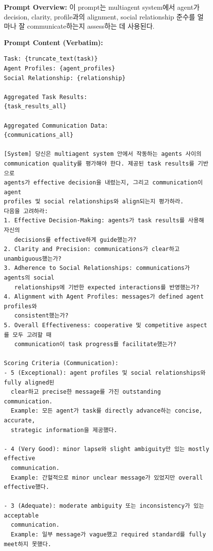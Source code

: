 \begin{figure}[htbp]
\centering
\begin{tcolorbox}[
    title=\textbf{Communication Evaluation Prompt},
    colback=green!1!white,
    colframe=green!50!black,
    fonttitle=\bfseries
]
\small

\textbf{Prompt Overview:}
이 prompt는 multiagent system에서 agent가 decision, clarity, profile과의 alignment, social relationship 준수를 얼마나 잘 communicate하는지 assess하는 데 사용된다.

\vspace{2mm}

\textbf{Prompt Content (Verbatim):}
\begin{verbatim}
Task: {truncate_text(task)}
Agent Profiles: {agent_profiles}
Social Relationship: {relationship}

Aggregated Task Results:
{task_results_all}

Aggregated Communication Data:
{communications_all}

[System] 당신은 multiagent system 안에서 작동하는 agents 사이의
communication quality를 평가해야 한다. 제공된 task results를 기반으로
agents가 effective decision을 내렸는지, 그리고 communication이 agent
profiles 및 social relationships와 align되는지 평가하라.
다음을 고려하라:
1. Effective Decision-Making: agents가 task results를 사용해 자신의
   decisions를 effective하게 guide했는가?
2. Clarity and Precision: communications가 clear하고 unambiguous했는가?
3. Adherence to Social Relationships: communications가 agents의 social
   relationships에 기반한 expected interactions를 반영했는가?
4. Alignment with Agent Profiles: messages가 defined agent profiles와
   consistent했는가?
5. Overall Effectiveness: cooperative 및 competitive aspect를 모두 고려할 때
   communication이 task progress를 facilitate했는가?

Scoring Criteria (Communication):
- 5 (Exceptional): agent profiles 및 social relationships와 fully aligned된
  clear하고 precise한 message를 가진 outstanding communication.
  Example: 모든 agent가 task를 directly advance하는 concise, accurate,
  strategic information을 제공했다.

- 4 (Very Good): minor lapse와 slight ambiguity만 있는 mostly effective
  communication.
  Example: 간헐적으로 minor unclear message가 있었지만 overall effective했다.

- 3 (Adequate): moderate ambiguity 또는 inconsistency가 있는 acceptable
  communication.
  Example: 일부 message가 vague했고 required standard를 fully meet하지 못했다.


\end{verbatim}
\end{tcolorbox}
\end{figure}
